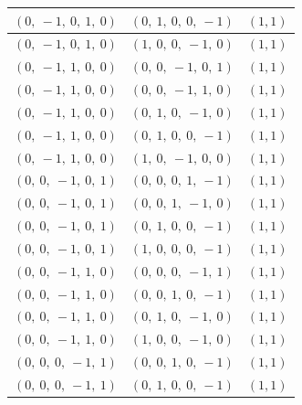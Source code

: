 \documentclass[11pt]{article}
\theoremstyle{definition}
\begin{document}
\begin{tabular}{|l|l|c|}
    \hline
    $\left( 0, \  -1, \  0, \  1, \  0\right)$ & $\left( 0, \  1, \  0, \  0, \  -1\right)$ & $(1,1)$ \\
    \hline
    $\left( 0, \  -1, \  0, \  1, \  0\right)$ & $\left( 1, \  0, \  0, \  -1, \  0\right)$ & $(1,1)$ \\
    \hline
    $\left( 0, \  -1, \  1, \  0, \  0\right)$ & $\left( 0, \  0, \  -1, \  0, \  1\right)$ & $(1,1)$ \\
    \hline
    $\left( 0, \  -1, \  1, \  0, \  0\right)$ & $\left( 0, \  0, \  -1, \  1, \  0\right)$ & $(1,1)$ \\
    \hline
    $\left( 0, \  -1, \  1, \  0, \  0\right)$ & $\left( 0, \  1, \  0, \  -1, \  0\right)$ & $(1,1)$ \\
    \hline
    $\left( 0, \  -1, \  1, \  0, \  0\right)$ & $\left( 0, \  1, \  0, \  0, \  -1\right)$ & $(1,1)$ \\
    \hline
    $\left( 0, \  -1, \  1, \  0, \  0\right)$ & $\left( 1, \  0, \  -1, \  0, \  0\right)$ & $(1,1)$ \\
    \hline
    $\left( 0, \  0, \  -1, \  0, \  1\right)$ & $\left( 0, \  0, \  0, \  1, \  -1\right)$ & $(1,1)$ \\
    \hline
    $\left( 0, \  0, \  -1, \  0, \  1\right)$ & $\left( 0, \  0, \  1, \  -1, \  0\right)$ & $(1,1)$ \\
    \hline
    $\left( 0, \  0, \  -1, \  0, \  1\right)$ & $\left( 0, \  1, \  0, \  0, \  -1\right)$ & $(1,1)$ \\
    \hline
    $\left( 0, \  0, \  -1, \  0, \  1\right)$ & $\left( 1, \  0, \  0, \  0, \  -1\right)$ & $(1,1)$ \\
    \hline
    $\left( 0, \  0, \  -1, \  1, \  0\right)$ & $\left( 0, \  0, \  0, \  -1, \  1\right)$ & $(1,1)$ \\
    \hline
    $\left( 0, \  0, \  -1, \  1, \  0\right)$ & $\left( 0, \  0, \  1, \  0, \  -1\right)$ & $(1,1)$ \\
    \hline
    $\left( 0, \  0, \  -1, \  1, \  0\right)$ & $\left( 0, \  1, \  0, \  -1, \  0\right)$ & $(1,1)$ \\
    \hline
    $\left( 0, \  0, \  -1, \  1, \  0\right)$ & $\left( 1, \  0, \  0, \  -1, \  0\right)$ & $(1,1)$ \\
    \hline
    $\left( 0, \  0, \  0, \  -1, \  1\right)$ & $\left( 0, \  0, \  1, \  0, \  -1\right)$ & $(1,1)$ \\
    \hline
    $\left( 0, \  0, \  0, \  -1, \  1\right)$ & $\left( 0, \  1, \  0, \  0, \  -1\right)$ & $(1,1)$ \\

\end{tabular}
\end{document}
